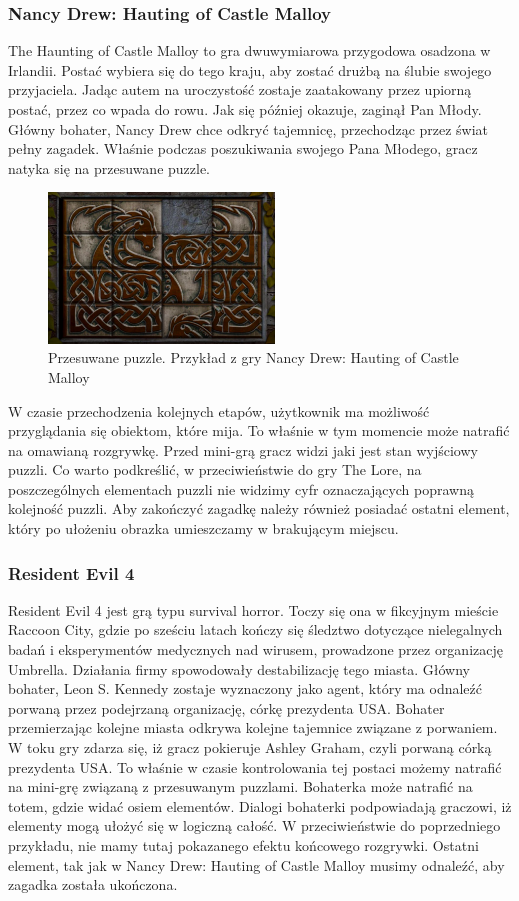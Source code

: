 \documentclass[oneside,polski,logo]{amuthesis}
\begin{document}
\subsubsection{Nancy Drew: Hauting of Castle Malloy}
The Haunting of Castle Malloy to gra dwuwymiarowa przygodowa osadzona w Irlandii. Postać wybiera się do tego kraju, aby zostać drużbą na ślubie swojego przyjaciela. Jadąc autem na uroczystość zostaje zaatakowany przez upiorną postać, przez co wpada do rowu. Jak się później okazuje, zaginął Pan Młody. Główny bohater, Nancy Drew chce odkryć tajemnicę, przechodząc przez świat pełny zagadek. Właśnie podczas poszukiwania swojego Pana Młodego, gracz natyka się na przesuwane puzzle. 
\begin{figure}[h]
	\centering
	\includegraphics[width=6cm]{images/tyrek/nd.png}
	\caption{Przesuwane puzzle. Przykład z gry Nancy Drew: Hauting of Castle Malloy}
\end{figure}

W czasie przechodzenia kolejnych etapów, użytkownik ma możliwość przyglądania się obiektom, które mija. To właśnie w tym momencie może natrafić na omawianą rozgrywkę. Przed mini-grą gracz widzi jaki jest stan wyjściowy puzzli. Co warto podkreślić, w przeciwieństwie do gry The Lore, na poszczególnych elementach puzzli nie widzimy cyfr oznaczających poprawną kolejność puzzli. Aby zakończyć zagadkę należy również posiadać ostatni element, który po ułożeniu obrazka umieszczamy w brakującym miejscu. \cite{nd}


\subsubsection{Resident Evil 4}
Resident Evil 4 jest grą typu survival horror. Toczy się ona w fikcyjnym mieście Raccoon City, gdzie po sześciu latach kończy się śledztwo dotyczące nielegalnych badań i eksperymentów medycznych nad wirusem, prowadzone przez organizację Umbrella. Działania firmy spowodowały destabilizację tego miasta. Główny bohater, Leon S. Kennedy zostaje wyznaczony jako agent, który ma odnaleźć porwaną przez podejrzaną organizację, córkę prezydenta USA. Bohater przemierzając kolejne miasta odkrywa kolejne tajemnice związane z porwaniem. W toku gry zdarza się, iż gracz pokieruje Ashley Graham, czyli porwaną córką prezydenta USA. To właśnie w czasie kontrolowania tej postaci możemy natrafić na mini-grę związaną z przesuwanym puzzlami. Bohaterka może natrafić na totem, gdzie widać osiem elementów. Dialogi bohaterki podpowiadają graczowi, iż elementy mogą ułożyć się w logiczną całość. W przeciwieństwie do poprzedniego przykładu, nie mamy tutaj pokazanego efektu końcowego rozgrywki. Ostatni element, tak jak w Nancy Drew: Hauting of Castle Malloy musimy odnaleźć, aby zagadka została ukończona.
\end{document}
